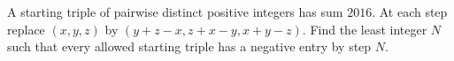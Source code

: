 A starting triple of pairwise distinct positive integers has sum $2016$. At each step replace $(x,y,z)$ by $(y+z-x,z+x-y,x+y-z)$. Find the least integer $N$ such that every allowed starting triple has a negative entry by step $N$.
